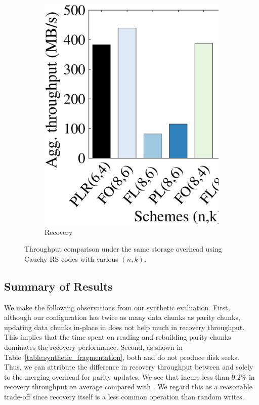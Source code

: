 \begin{figure}[!t]
\begin{subfigure}{0.4\linewidth}
    \includegraphics[width=\linewidth]{charts/reserve_overhead/eps/reserve_overhead_recover}
    \caption{Recovery}
    \label{subfig:recovery}
\end{subfigure}
\caption{Throughput comparison under the same storage
 overhead using Cauchy RS codes with various $(n,k)$.}
\label{fig:reserve_comparison}
\end{figure}

\subsection{Summary of Results}

We make the following observations from our synthetic evaluation.
First, although our configuration has twice as many data chunks as
parity chunks, updating data chunks in-place in \PL does not help much in
recovery throughput.  This implies that the time spent on reading and
rebuilding parity chunks dominates the recovery performance.  Second, as shown
in Table~\ref{table:synthetic_fragmentation}, both \FO and \PLR do not
produce disk seeks. Thus, we can attribute the difference in recovery
throughput between \FO and \PLR solely to the merging overhead for parity
updates. We see that \PLR incurs less than ${9.2\%}$ in recovery
throughput on average compared with \FO. We regard this as a reasonable
trade-off since recovery itself is a less common operation than random writes.

